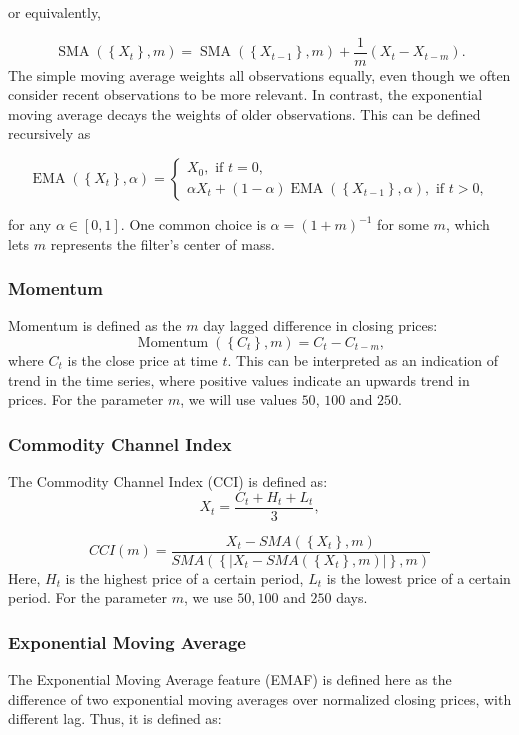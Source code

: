 \documentclass[twoside]{report}
\begin{document}
\begin{spacing}{1}
or equivalently,

\[
\operatorname{SMA}\left(\left\{X_{t}\right\}, m\right)=\operatorname{SMA}\left(\left\{X_{t-1}\right\}, m\right)+\frac{1}{m}\left(X_{t}-X_{t-m}\right).
\]
The simple moving average weights all observations equally, even though we often consider recent observations to be more relevant. In contrast, the exponential moving average decays the weights of older observations. This can be defined recursively as

\[
\operatorname{EMA}\left(\left\{X_{t}\right\}, \alpha\right)=\left\{\begin{array}{l}
X_{0}, \text { if } t=0, \\
\alpha X_{t}+(1-\alpha) \operatorname{EMA}\left(\left\{X_{t-1}\right\}, \alpha\right), \text { if } t>0,
\end{array}\right.
\]

for any $\alpha \in [0,1]$. One common choice is $\alpha = (1+m)^{-1}$ for some $m$, which lets $m$ represents the filter's center of mass.


\subsubsection{Momentum}
Momentum is defined as the $m$ day lagged difference in closing prices:
\[
\operatorname{Momentum}\left(\left\{C_{t}\right\}, m\right)=C_{t}-C_{t-m},
\]
where $C_t$ is the close price at time $t$. This can be interpreted as an indication of trend in the time series, where positive values indicate an upwards trend in prices. For the parameter $m$, we will use values $50$, $100$ and $250$.


\subsubsection{Commodity Channel Index}
The Commodity Channel Index (CCI) is defined as:
\[
X_{t}=\frac{C_{t}+H_{t}+L_{t}}{3},
\]

\[
C C I(m)=\frac{X_{t}-S M A\left(\left\{X_{t}\right\}, m\right)}{S M A\left(\left\{\left|X_{t}-S M A\left(\left\{X_{t}\right\}, m\right)\right|\right\}, m\right)}
\]
Here, $H_t$ is the highest price of a certain period, $L_t$ is the lowest price of a certain period.  For the parameter $m$, we use $50, 100$ and $250$ days.

\subsubsection{Exponential Moving Average}
The Exponential Moving Average feature (EMAF) is defined here as the
difference of two exponential moving averages over normalized closing prices,
with different lag. Thus, it is defined as:


\end{spacing}
\end{document}
